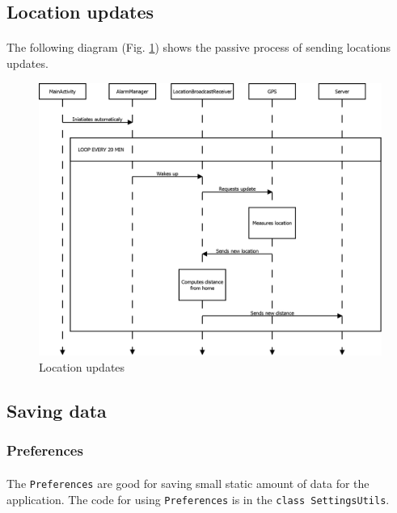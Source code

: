 \documentclass[12pt]{article}
\begin{document}
\subsection{Location updates}
\paragraph{}The following diagram (Fig. \ref{fig:locationupdates}) shows the passive process of sending locations updates.

\begin{figure}[ht]
	\centering
		\includegraphics[width=16cm]{graphs/locationupdates.png}
	\caption{Location updates}
	\label{fig:locationupdates}
\end{figure}


\subsection{Saving data}
\subsubsection{Preferences}
\paragraph{}The \verb?Preferences? are good for saving small static amount of data for the application. The code for using \verb?Preferences? is in the \verb?class SettingsUtils?.
\end{document}
